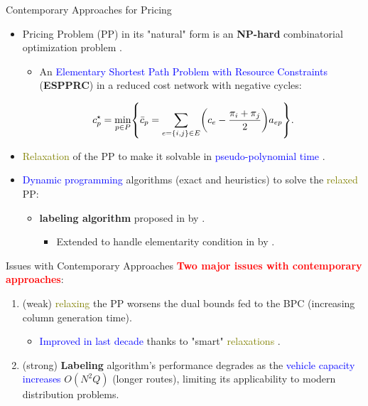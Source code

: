\begin{frame}{Contemporary Approaches for Pricing}
	\begin{itemize}[<+->]
		\item Pricing Problem (PP) in its "natural" form is an \textbf{NP-hard} combinatorial optimization problem \parencite{dror1994}.
		      \begin{itemize}[<.->]
			      \item An \textcolor{blue}{Elementary Shortest Path Problem with Resource Constraints} (\textbf{ESPPRC}) in a reduced cost network with negative cycles:
		      \end{itemize}
		      \begin{equation}\label{eq:pp-problem}
			      {c^\star_p} = \min_{p \in P} \Set*{ \bar{c}_p = \sum_{e = \Set*{i, j} \in E} \Expr*{c_{e} - \frac{\pi_i + \pi_j}{2}} a_{ep}  }.
		      \end{equation}
		\item \textcolor{olive}{Relaxation} of the PP to make it solvable in \textcolor{blue}{pseudo-polynomial time} \parencite{desrochers1988, irnich2005}.
		\item \textcolor{blue}{Dynamic programming} algorithms (exact and heuristics) to solve the \textcolor{olive}{relaxed} PP:
		      \begin{itemize}[<.->]
			      \item \textbf{labeling algorithm} proposed in \citeyear{desrochers1992} by \textcite{desrochers1992}.
			            \begin{itemize}[<.->]
				            \item Extended to handle elementarity condition in \citeyear{feillet2004} by \textcite{feillet2004}.
			            \end{itemize}
		      \end{itemize}

	\end{itemize}
\end{frame}

\begin{frame}{Issues with Contemporary Approaches}
	\textcolor{red}{\textbf{Two major issues with contemporary approaches}}:
	\begin{enumerate}
		\item (weak) \textcolor{olive}{relaxing} the PP worsens the dual bounds fed to the BPC (increasing column generation time).
		      \begin{itemize}[<.->]
			      \item \textcolor{blue}{Improved in last decade} thanks to "smart" \textcolor{olive}{relaxations} \parencite{baldacci2011}.
		      \end{itemize}
		\item (strong) \textbf{Labeling} algorithm's performance degrades as the \textcolor{blue}{vehicle capacity increases} $O(N^2 Q)$ (longer routes), limiting its applicability to modern distribution problems.
	\end{enumerate}
\end{frame}

